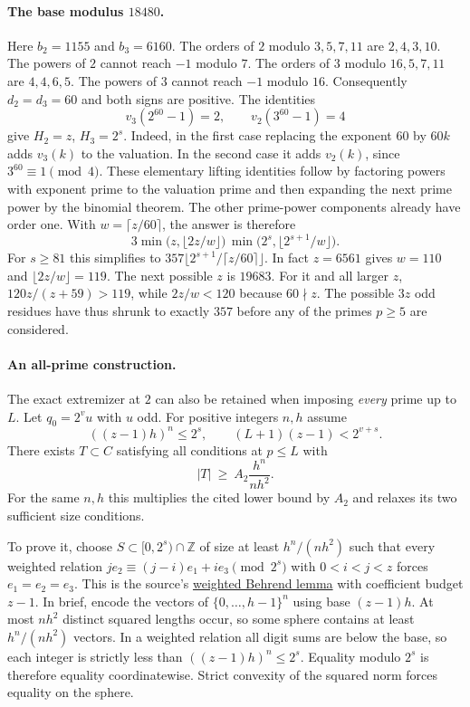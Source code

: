 \paragraph{The base modulus $18480$.}
Here $b_2=1155$ and $b_3=6160$. The orders of $2$ modulo $3,5,7,11$
are $2,4,3,10$. The powers of $2$ cannot reach $-1$ modulo $7$. The orders of $3$
modulo $16,5,7,11$ are $4,4,6,5$. The powers of $3$ cannot reach $-1$ modulo $16$.
Consequently $d_2=d_3=60$ and both signs are positive. The identities
\[
 v_3(2^{60}-1)=2,\qquad v_2(3^{60}-1)=4
\]
give $H_2=z$, $H_3=2^s$. Indeed, in the first case replacing the
exponent $60$ by $60k$ adds $v_3(k)$ to the valuation. In the second
case it adds $v_2(k)$, since $3^{60}\equiv1\pmod4$. These elementary
lifting identities follow by factoring powers with exponent prime to
the valuation prime and then expanding the next prime power by the
binomial theorem. The other prime-power components already have order
one. With $w=\lceil z/60\rceil$, the answer is therefore
\[
 3\min\bigl(z,\lfloor 2z/w\rfloor\bigr)\,
   \min\bigl(2^s,\lfloor 2^{s+1}/w\rfloor\bigr).
\]
For $s\ge81$ this simplifies to
$357\lfloor2^{s+1}/\lceil z/60\rceil\rfloor$.
In fact $z=6561$ gives $w=110$ and $\lfloor2z/w\rfloor=119$.
The next possible $z$ is $19683$. For it and all larger $z$,
$120z/(z+59)>119$, while $2z/w<120$ because $60\nmid z$.
The possible $3z$ odd residues have thus shrunk to exactly $357$ before
any of the primes $p\ge5$ are considered.

\paragraph{An all-prime construction.}
The exact extremizer at $2$ can also be retained when imposing \emph{every}
prime up to $L$. Let $q_0=2^v u$ with $u$ odd. For positive integers $n,h$
assume
\[
 ((z-1)h)^n\le2^s,\qquad (L+1)(z-1)<2^{v+s}.
\]
There exists $T\subset C$ satisfying all conditions at $p\le L$ with
\[
                    |T|\ \ge\ A_2\frac{h^n}{n h^2}.
\]
For the same $n,h$ this multiplies the cited lower bound by $A_2$
and relaxes its two sufficient size conditions.

To prove it, choose $S\subset[0,2^s)\cap\mathbb Z$ of size at least
$h^n/(nh^2)$ such that every weighted relation
$j e_2\equiv (j-i)e_1+i e_3\pmod{2^s}$ with $0<i<j<z$ forces
$e_1=e_2=e_3$. This is the source's
\href{https://github.com/lsernau/grh-lean/blob/72fead102f663d5c7a407964a13dc0cf9d977207/grh/src/New/Reduction/Data/Existence.lean\#L77-L117}{weighted Behrend lemma}
with coefficient budget $z-1$. In brief, encode the vectors of
$\{0,\ldots,h-1\}^n$ using base $(z-1)h$. At most $nh^2$ distinct
squared lengths occur, so some sphere contains at least $h^n/(nh^2)$
vectors. In a weighted relation all digit sums
are below the base, so each integer is strictly less than $((z-1)h)^n\le2^s$. Equality modulo $2^s$ is therefore equality coordinatewise. Strict
convexity of the squared norm forces equality on the sphere.

